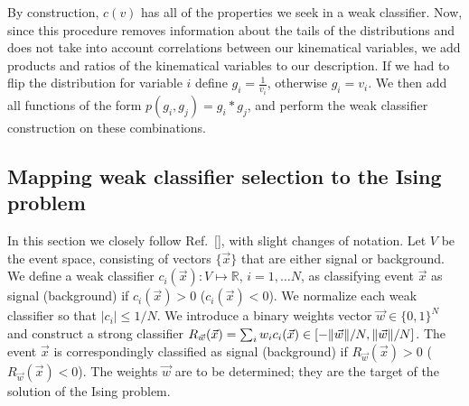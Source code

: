 \documentclass[fleqn,10pt]{wlscirep}
\begin{document}
 By construction, $c(v)$ has all of the properties we seek in a weak classifier. Now, since this procedure removes information about the tails of the distributions and does not take into account correlations between our kinematical variables, we add products and ratios of the kinematical variables to our description. If we had to flip the distribution for variable $i$ define $g_i = \frac{1}{v_i}$, otherwise $g_i=v_i$. We then add all functions of the form $p(g_i,g_j) = g_i*g_j$, and perform the weak classifier construction on these combinations.

\subsection*{Mapping weak classifier selection to the Ising problem}
In this section we closely follow Ref.~[], with slight changes of notation. Let $V$ be the event space, consisting of vectors $\{\vec{x}\}$ that are either signal or background. We define a weak classifier $c_i(\vec{x}):V\mapsto \mathbb{R}$, $i=1,\dots N$, as classifying event $\vec{x}$ as signal (background) if $c_i(\vec{x})>0$ ($c_i(\vec{x})<0$). We normalize each weak classifier so that $|c_i|\leq 1/N$. We introduce a binary weights vector $\vec{w} \in \{0,1\}^N$ and construct a strong classifier $R_{\vec{w}}(\vec{x}) = \sum_i w_i c_i(\vec{x})\in[-{\norm{\vec{w}}}/{N},{\norm{\vec{w}}}/{N}]$. The event $\vec{x}$ is correspondingly classified as signal (background) if $R_{\vec{w}}(\vec{x})>0$ ($R_{\vec{w}}(\vec{x})<0$). The weights $\vec{w}$ are to be determined; they are the target of the solution of the Ising problem.
\end{document}
